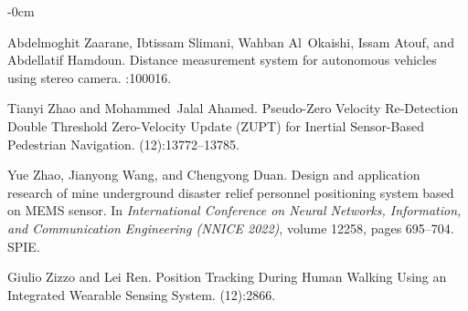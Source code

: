 \documentclass[engproc,conferenceproceedings,submit,pdftex,moreauthors]{Definitions/mdpi}
\begin{document}
\begin{adjustwidth}{-\extralength}{0cm}
\begin{thebibliography}{999}
Abdelmoghit Zaarane, Ibtissam Slimani, Wahban Al~Okaishi, Issam Atouf, and
Abdellatif Hamdoun.
\newblock Distance measurement system for autonomous vehicles using stereo
camera.
:100016.

Tianyi Zhao and Mohammed~Jalal Ahamed.
\newblock Pseudo-{{Zero Velocity Re-Detection Double Threshold Zero-Velocity
		Update}} ({{ZUPT}}) for {{Inertial Sensor-Based Pedestrian Navigation}}.
(12):13772--13785.

Yue Zhao, Jianyong Wang, and Chengyong Duan.
\newblock Design and application research of mine underground disaster relief
personnel positioning system based on {{MEMS}} sensor.
\newblock In {\em International {{Conference}} on {{Neural Networks}},
	{{Information}}, and {{Communication Engineering}} ({{NNICE}} 2022)}, volume
12258, pages 695--704. {SPIE}.

Giulio Zizzo and Lei Ren.
\newblock Position {{Tracking During Human Walking Using}} an {{Integrated
		Wearable Sensing System}}.
(12):2866.
\end{thebibliography}

%


\PublishersNote{}
\end{adjustwidth}
\end{document}
